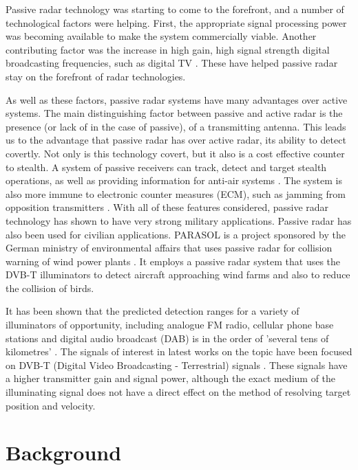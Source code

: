 \documentclass[12pt,openany,a4paper]{book}
\begin{document}
\bigskip

Passive radar technology was starting to come to the forefront, and a number of technological factors were helping. First, the appropriate signal processing power was becoming available to make the system commercially viable. Another contributing factor was the increase in high gain, high signal strength digital broadcasting frequencies, such as digital TV \cite{JE8}. These have helped passive radar stay on the forefront of radar technologies.

\bigskip

As well as these factors, passive radar systems have many advantages over active systems. The main distinguishing factor between passive and active radar is the presence (or lack of in the case of passive), of a transmitting antenna. This leads us to the advantage that passive radar has over active radar, its ability to detect covertly. Not only is this technology covert, but it also is a cost effective counter to stealth. A system of passive receivers can track, detect and target stealth operations, as well as providing information for anti-air systems \cite{Arend}. The system is also more immune to electronic counter measures (ECM), such as jamming from opposition transmitters \cite{HK6}. With all of these features considered, passive radar technology has shown to have very strong military applications. Passive radar has also been used for civilian applications. PARASOL is a project sponsored by the German ministry of environmental affairs that uses passive radar for collision warning of wind power plants \cite{HK5}. It employs a passive radar system that uses the DVB-T illuminators to detect aircraft approaching wind farms and also to reduce the collision of birds.

\bigskip

It has been shown that the predicted detection ranges for a variety of illuminators of opportunity, including analogue FM radio, cellular phone base stations and digital audio broadcast (DAB) is in the order of 'several tens of kilometres' \cite{HD9}. The signals of interest in latest works on the topic have been focused on DVB-T (Digital Video Broadcasting - Terrestrial) signals \cite{gcc,MB11,MC12,MK13}. These signals have a higher transmitter gain and signal power, although the exact medium of the illuminating signal does not have a direct effect on the method of resolving target position and velocity.

\cleardoublepage

\chapter{Background}
\end{document}
